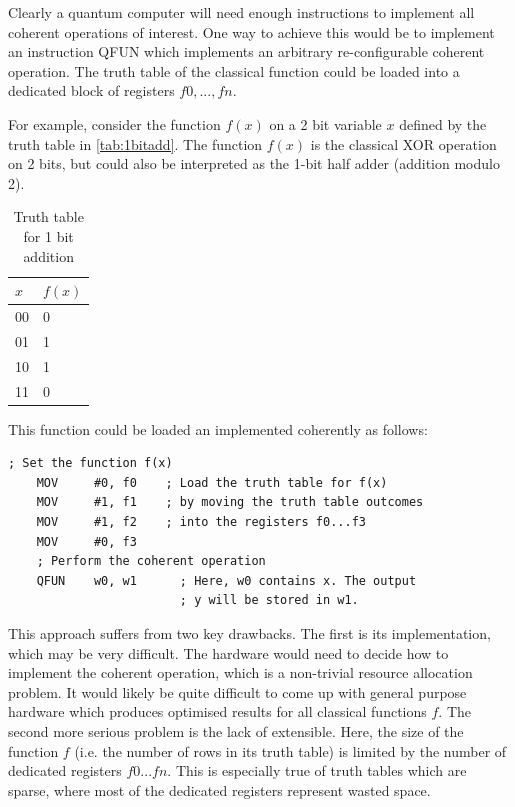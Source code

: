 Clearly a quantum computer will need enough instructions to implement all coherent operations of interest. One way to achieve this would be to implement an instruction QFUN which implements an arbitrary re-configurable coherent operation. The truth table of the classical function could be loaded into a dedicated block of registers $f0,...,fn$. 

For example, consider the function $f(x)$ on a 2 bit variable $x$ defined by the truth table in \autoref{tab:1bitadd}. The function $f(x)$ is the classical XOR operation on 2 bits, but could also be interpreted as the 1-bit half adder (addition modulo 2).

\begin{table}[!htb]
    \caption{Truth table for 1 bit addition}
    \label{tab:1bitadd}
      \centering
        \begin{tabular}{|l||l|}
        \hline
        $x$ & $f(x)$ \\ \hline
        00  & 0      \\ 
        01  & 1       \\ 
        10  & 1       \\ 
        11  & 0       \\
        \hline
    \end{tabular}
\end{table}

This function could be loaded an implemented coherently as follows:

\begin{lstlisting}[language=Asm]
    ; Set the function f(x)
    MOV     #0, f0    ; Load the truth table for f(x)
    MOV     #1, f1    ; by moving the truth table outcomes
    MOV     #1, f2    ; into the registers f0...f3
    MOV     #0, f3
    ; Perform the coherent operation
    QFUN    w0, w1      ; Here, w0 contains x. The output
                        ; y will be stored in w1.
\end{lstlisting}

This approach suffers from two key drawbacks. The first is its implementation, which may be very difficult. The hardware would need to decide how to implement the coherent operation, which is a non-trivial resource allocation problem. It would likely be quite difficult to come up with general purpose hardware which produces optimised results for all classical functions $f$. The second more serious problem is the lack of extensible. Here, the size of the function $f$ (i.e. the number of rows in its truth table) is limited by the number of dedicated registers $f0...fn$. This is especially true of truth tables which are sparse, where most of the dedicated registers represent wasted space. 

